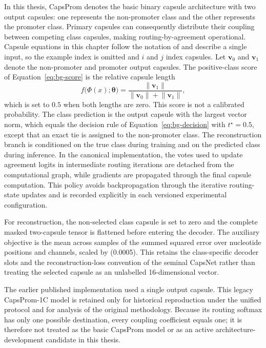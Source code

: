 In this thesis, CapsProm denotes the basic binary capsule architecture with two
output capsules: one represents the non-promoter class and the other represents
the promoter class. Primary capsules can consequently distribute their coupling
between competing class capsules, making routing-by-agreement operational. Capsule equations in this chapter
follow the notation of \citet{sabour2017dynamic} and describe a single input,
so the example index is omitted and $i$ and $j$ index capsules. Let
$\mathbf{v}_0$ and $\mathbf{v}_1$ denote the non-promoter and promoter output
capsules. The positive-class score of Equation~\eqref{eq:bg-score} is the
relative capsule length
\begin{equation}
  f\bigl(\Phi(x);\boldsymbol{\theta}\bigr)=\frac{\lVert\mathbf{v}_1\rVert}{\lVert\mathbf{v}_0\rVert+\lVert\mathbf{v}_1\rVert},
  \label{eq:models-capsule-score}
\end{equation}
which is set to $0.5$ when both lengths are zero. This score is not a calibrated
probability. The class prediction is the output capsule with the largest
vector norm, which equals the decision rule of Equation~\eqref{eq:bg-decision}
with $t^{\star}=0.5$, except that an exact tie is assigned to the
non-promoter class. The reconstruction branch is conditioned on the true class during
training and on the predicted class during inference. In the canonical
implementation, the votes used to update agreement logits in intermediate
routing iterations are detached from the computational graph, while gradients
are propagated through the final capsule computation. This policy avoids
backpropagation through the iterative routing-state updates and is recorded
explicitly in each versioned experimental configuration.

For reconstruction, the non-selected class capsule is set to zero and the
complete masked two-capsule tensor is flattened before entering the decoder.
The auxiliary objective is the mean across samples of the summed squared error
over nucleotide positions and channels, scaled by (0.0005). This retains the
class-specific decoder slots and the reconstruction-loss convention of the
seminal CapsNet rather than treating the selected capsule as an unlabelled
16-dimensional vector.

The earlier published implementation used a single output capsule. This legacy
CapsProm-1C model is retained only for historical reproduction under the unified
protocol and for analysis of the original methodology. Because its routing
softmax has only one possible destination, every coupling coefficient equals
one; it is therefore not treated as the basic CapsProm model or as an active
architecture-development candidate in this thesis.

